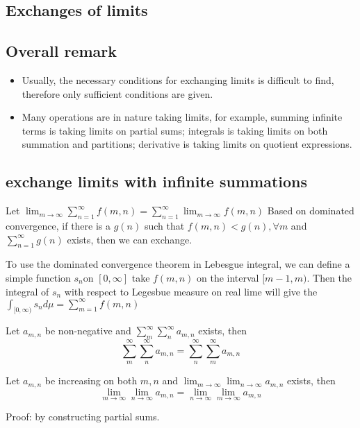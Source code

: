 \begin{refsection}
\section{Exchanges of limits}
\subsection{Overall remark}
\begin{remark}\hfill
\begin{itemize}
    \item Usually, the necessary conditions for exchanging limits is difficult to find, therefore only sufficient conditions are given. 
    \item Many operations are in nature taking limits, for example, summing infinite terms is taking limits on partial sums; integrals is taking limits on both summation and partitions; derivative is taking limits on quotient expressions. 
\end{itemize}

\end{remark}

\subsection{exchange limits with infinite summations}
Let $\lim_{m\to \infty}\sum_{n=1}^\infty f(m,n) = \sum_{n=1}^\infty \lim_{m\to \infty} f(m,n)$
Based on dominated convergence, if there is a $g(n)$ such that $f(m,n) < g(n),\forall m$ and $\sum_{n=1}^\infty g(n)$ exists, then we can exchange. 

To use the dominated convergence theorem in Lebesgue integral, we can define a simple function $s_n$on $[0,\infty]$ take $f(m,n)$ on the interval $[m-1,m)$. Then the integral of $s_n$ with respect to Legesbue measure on real lime will give the $\int_{[0,\infty)} s_n d\mu = \sum_{m=1}^\infty f(m,n)$



\begin{theorem}
\cite[94,373]{johnsonbaugh2010foundations}Let $a_{m,n}$ be non-negative and $\sum_m^\infty \sum_n^\infty a_{m,n}$ exists, 
then
$$\sum_m^\infty \sum_n^\infty a_{m,n} = \sum_n^\infty \sum_m^\infty a_{m,n}$$
\end{theorem}


\begin{corollary}
Let $a_{m,n}$ be increasing on both $m,n$ and $\lim_{m\to \infty}\lim_{n\to\infty} a_{m,n}$ exists, 
then
$$\lim_{m\to \infty}\lim_{n\to\infty} a_{m,n} = \lim_{n\to \infty}\lim_{m\to\infty} a_{m,n}$$
\end{corollary}
Proof: by constructing partial sums.


\end{refsection}
